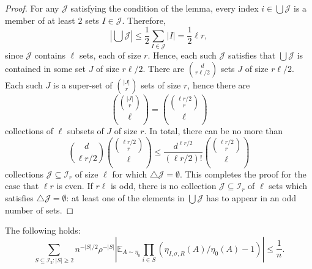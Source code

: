 \documentclass[final, 12pt]{colt2018}
\begin{document}
\begin{proof}
For any $\mathcal{J}$ satisfying the condition of the lemma, every index $i \in \bigcup \mathcal{J}$ is a member of at least $2$ sets $I \in \mathcal{J}$. Therefore,
\[
\left\lvert \bigcup \mathcal{J} \right\rvert 
\le \frac{1}{2} \sum_{I \in \mathcal{J}} \lvert I \rvert
= \frac{1}{2} \ell r,
\] 
since $\mathcal{J}$ contains $\ell$ sets, each of size $r$.
Hence, each such $\mathcal{J}$ satisfies that $\bigcup \mathcal J$ is contained in some set $J$ of size $r \ell /2$. There are $\binom{d}{r \ell/2}$ sets $J$ of size $r\ell/2$. Each such $J$ is a super-set of $\binom{|J|}{r}$ sets of size $r$, hence there are 
\[\binom{\binom{|J|}{r}}{\ell}
= \binom{\binom{\ell r/2}{r}}{\ell}
\]
collections of $\ell$ subsets of $J$ of size $r$. In total, there can be no more than
\[
\binom{d}{\ell r/2} \binom{\binom{\ell r/2}{r}}{\ell}
\le \frac{d^{\ell r/2}}{(\ell r/2)!} \binom{\binom{\ell r/2}{r}}{\ell}
\]
collections $\mathcal{J}\subseteq \mathcal{I}_r$ of size $\ell$ for which $\bigtriangleup\mathcal{J} = \emptyset$. This completes the proof for the case that $\ell r$ is even.
If $r \ell$ is odd, there is no collection $\mathcal{J}\subseteq \mathcal{I}_r$ of $\ell$ sets which satisfies $\bigtriangleup \mathcal{J} = \emptyset$: at least one of the elements in $\bigcup \mathcal{J}$ has to appear in an odd number of sets.
\end{proof}

\begin{lemma} \label{lem:g-corr}
The following holds:
\begin{equation} \label{eq:lem-gcorr}
\sum_{S \subseteq \mathcal{I}_2 \colon \lvert S \rvert \ge 2} n^{-\lvert S \rvert/2} \rho^{-\lvert S \rvert} \left\lvert \mathbb{E}_{A \sim \eta_0} \prod_{i\in S} \left(\eta_{I,\sigma,R}(A)/\eta_0(A) - 1\right) \right\rvert
\le \frac{1}{n}.
\end{equation}
\end{lemma}
\end{document}
